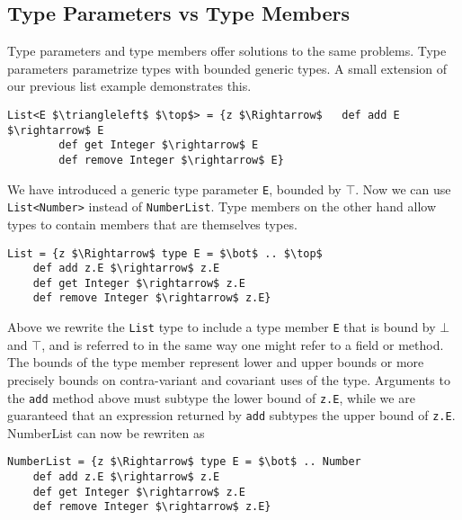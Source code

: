 \documentclass{llncs}
\numberwithin{subcase}{casethm}
\numberwithin{casethm}{theorem}
\numberwithin{casethm}{lemma}
\begin{document}
\subsection{Type Parameters vs Type Members}
Type parameters and type members offer solutions to 
the same problems. Type parameters parametrize types 
with bounded generic types. A small extension of 
our previous list example demonstrates this.
\begin{lstlisting}[mathescape, style=custom_lang]
List<E $\triangleleft$ $\top$> = {z $\Rightarrow$	def add E $\rightarrow$ E
		def get Integer $\rightarrow$ E
		def remove Integer $\rightarrow$ E}
\end{lstlisting}
We have introduced a generic type parameter \texttt{E}, bounded 
by $\top$. Now we can use \texttt{List<Number>} instead of 
\texttt{NumberList}. Type members on the other hand allow types to 
contain members that are themselves types.
\begin{lstlisting}[mathescape, style=custom_lang]
List = {z $\Rightarrow$ type E = $\bot$ .. $\top$
	def add z.E $\rightarrow$ z.E
	def get Integer $\rightarrow$ z.E
	def remove Integer $\rightarrow$ z.E}
\end{lstlisting}
Above we rewrite the \texttt{List} type to include a type member 
\texttt{E} that is bound by $\bot$ and $\top$, and is referred to 
in the same way one might refer to a field or method. The bounds 
of the type member represent lower and upper bounds or more precisely 
bounds on contra-variant and covariant uses of the type. Arguments to
the \texttt{add} method above must subtype the lower bound of \texttt{z.E}, 
while we are guaranteed that an expression returned by \texttt{add} 
subtypes the upper bound of \texttt{z.E}. NumberList can now be 
rewriten as 
\begin{lstlisting}[mathescape, style=custom_lang]
NumberList = {z $\Rightarrow$ type E = $\bot$ .. Number
	def add z.E $\rightarrow$ z.E
	def get Integer $\rightarrow$ z.E
	def remove Integer $\rightarrow$ z.E}
\end{lstlisting}
\end{document}
